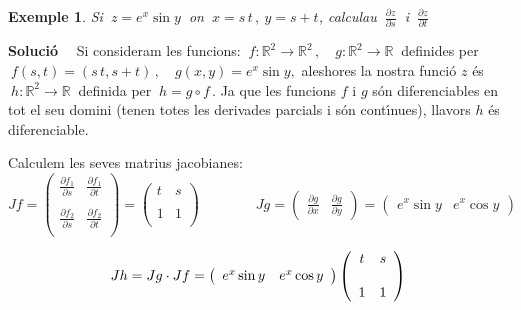 \documentclass[12pt]{article}
\newcommand{\solucio}{\textbf{Soluci{\'o}}\ \ }
\newtheorem{exemple}{Exemple}[subsection]
\newcommand{\R}{\mathbb{R}}
\begin{document}
\vspace{0.4cm}
\begin{exemple}
Si $\ z=e^x \sin y\ $ on $\ x=s\, t\,,\ y=s + t$, calculau
$\ \displaystyle\frac{\partial z}{\partial s}\ $ i $\ \displaystyle\frac{\partial z}{\partial t}\,$
\end{exemple}

\solucio
Si consideram les funcions: $\ f:\R^2\longrightarrow \R^2\,,\quad g:\R^2\longrightarrow \R\ $ definides per $\ f(s,t)=(s\,t,s+ t)\,, \quad g(x,y)=e^x \sin y,$ aleshores la nostra funci{\'o} $z$ {\'e}s $\ h:\R^2\longrightarrow \R\ $ definida per $\ h=g\circ f\,.$ Ja que les funcions $f$ i $g$ s{\'o}n diferenciables en tot el seu domini (tenen totes les derivades parcials i s{\'o}n cont{\'\i}nues), llavors  $h$ {\'e}s diferenciable.

Calculem les seves matrius jacobianes:
\begin{equation*}
Jf=\left(\begin{array} {cc}
   \displaystyle\frac{\partial f_1}{\partial s} & \displaystyle\frac{\partial f_1}{\partial t} \\
   &\\
   \displaystyle\frac{\partial f_2}{\partial s} & \displaystyle\frac{\partial f_2}{\partial t} \\
   \end{array} \right)=
   \left(\begin{array} {cc}
   t &  s \\
  &\\
  1 & 1 \\
   \end{array} \right)
   \qquad\qquad Jg=\left(\begin{array} {cc}
  \displaystyle \frac{\partial g}{\partial x} & \displaystyle\frac{\partial g}{\partial y}
\end{array} \right)=\left(\begin{array} {cc}
 e^x \sin y  & e^x \cos y
\end{array} \right)
\end{equation*}

\begin{equation*}
Jh=Jg\cdot Jf = \left(\begin{array} {cc}
 e^x \sin y  & e^x \cos y
\end{array} \right)\left(\begin{array} {cc}
   t & s \\
  &\\
  1 & 1 \\
   \end{array} \right)\\
\end{equation*}
\end{document}
